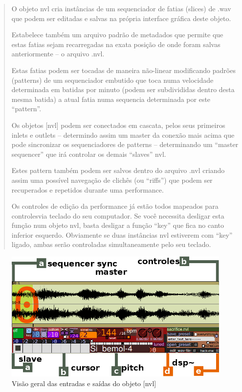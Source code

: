 \documentclass[draft]{ppgmus}
\begin{document}
\begin{quotation}
 O objeto nvl cria instâncias de um sequenciador de fatias (slices) de .wav que podem ser editadas e salvas na 
própria interface gráfica deste objeto.

Estabelece também um arquivo padrão de metadados que permite que estas fatias sejam recarregadas na 
exata posição de onde foram salvas anteriormente – o arquivo .nvl.

Estas fatias podem ser tocadas de maneira não-linear modificando padrões (patterns) de um sequenciador 
embutido que toca numa velocidade determinada em batidas por minuto (podem ser subdivididas dentro desta 
mesma batida) a atual fatia numa sequencia determinada por este “pattern”.

Os objetos [nvl] podem ser conectados em cascata, pelos seus primeiros inlets e outlets – determindo 
assim um master da conexão mais acima que pode sincronizar os sequenciadores de patterns – determinando um 
“master sequencer” que irá controlar os demais “slaves” nvl.

Estes pattern também podem ser salvos dentro do arquivo .nvl criando assim uma possível navegação de clichês 
(ou “riffs”) que podem ser recuperados e repetidos durante uma performance.

Os controles de edição da performance já estão todos mapeados para controlesvia teclado do seu computador. 
Se você necessita desligar esta função num objeto nvl, basta desligar a função “key” que fica no canto inferior 
esquerdo. Obviamente se duas instâncias nvl estiverem com “key” ligado, ambas serão controladas simultaneamente 
pelo seu teclado.
\end{quotation} 

\begin{figure}
\includegraphics[scale=.6]{nvl1}
\caption{Visão geral das entradas e saídas do objeto [nvl]}
\label{nvl1}
\end{figure}
\end{document}
